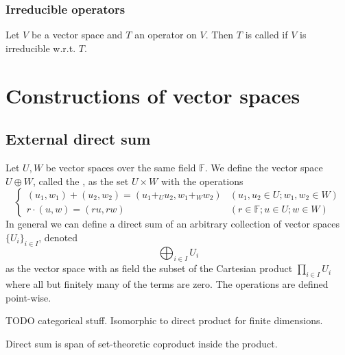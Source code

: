 \subsubsection{Irreducible operators}
\begin{definition}
Let $V$ be a vector space and $T$ an operator on $V$. Then $T$ is called  if $V$ is irreducible w.r.t. $T$.
\end{definition}

\section{Constructions of vector spaces}

\subsection{External direct sum}
\begin{definition}
Let $U,W$ be vector spaces over the same field $\mathbb{F}$. We define the vector space  $U\oplus W$, called the , as the set $U\times W$ with the operations
\[ \begin{cases}
(u_1,w_1) + (u_2, w_2) = (u_1 +_U u_2, w_1 +_W w_2) & (u_1,u_2 \in U; w_1, w_2 \in W) \\
r\cdot (u,w) = (ru, rw) & (r\in \mathbb{F}; u\in U; w \in W)
\end{cases} \]
In general we can define a direct sum of an arbitrary collection of vector spaces $\{U_i\}_{i\in I}$, denoted
\[ \bigoplus_{i\in I}U_i \]
as the vector space with as field the subset of the Cartesian product $\prod_{i\in I}U_i$ where all but finitely many of the terms are zero. The operations are defined point-wise.
\end{definition}

TODO categorical stuff. Isomorphic to direct product for finite dimensions.

\begin{proposition}
Direct sum is span of set-theoretic coproduct inside the product.
\end{proposition}



